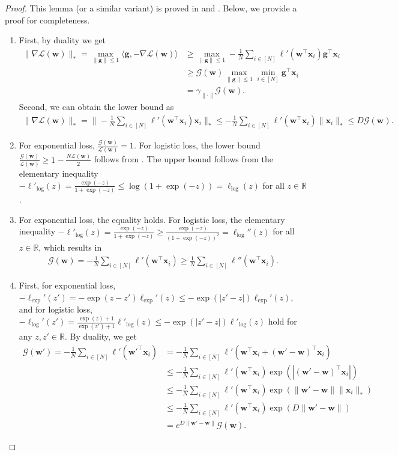 \documentclass{article} %
\theoremstyle{plain}
\theoremstyle{definition}
\theoremstyle{remark}
\def\gG{{\mathcal{G}}}
\newcommand{\Ls}{\mathcal{L}}
\def\bx{{\mathbf x}}
\def\bw{{\mathbf w}}
\def\bg{{\mathbf g}}
\begin{document}
\begin{proof}
This lemma (or a similar variant) is proved in \citet{zhang2024the} and \citet{fan2025implicitbiasspectraldescent}. Below, we provide a proof for completeness.
\begin{enumerate}[label=(\alph*)]
    \item First, by duality we get
    \begin{align*}
        \|\nabla \Ls(\bw)\|_* = \max_{\|\bg\|\leq 1} \langle \bg, -\nabla \Ls(\bw) \rangle &\geq \max_{\|\bg\|\leq 1} -\frac{1}{N} \sum_{i\in [N]} \ell'(\bw^\top \bx_i) \bg^\top \bx_i \\
        &\geq \gG(\bw) \max_{\|\bg\|\leq 1} \min_{i\in [N]} \bg^\top \bx_i \\
        &= \gamma_{\|\cdot\|} \gG(\bw).
    \end{align*}
    Second, we can obtain the lower bound as
    \begin{align*}
        \|\nabla \Ls(\bw)\|_* = \|-\frac{1}{N}\sum_{i\in [N]} \ell'(\bw^\top \bx_i) \bx_i\|_* \leq -\frac{1}{N} \sum_{i\in [N]} \ell'(\bw^\top \bx_i) \|\bx_i\|_* \leq D \gG(\bw).
    \end{align*}
    \item For exponential loss, $\frac{\gG(\bw)}{\Ls(\bw)}=1$. For logistic loss, the lower bound $\frac{\gG(\bw)}{\Ls(\bw)}\geq 1 - \frac{N\Ls(\bw)}{2}$ follows from \citet[Lemma C.7]{zhang2024the}. The upper bound follows from the elementary inequality $-\ell'_{\log}(z) = \frac{\exp(-z)}{1+\exp(-z)} \leq \log(1+\exp(-z)) = \ell_{\log} (z)$ for all $z\in \mathbb R$.
    \item For exponential loss, the equality holds. For logistic loss, the elementary inequality $-\ell'_{\log}(z) = \frac{\exp(-z)}{1+\exp(-z)} \geq \frac{\exp(-z)}{(1+\exp(-z))^2} = \ell_{\log}'' (z)$ for all $z\in \mathbb R$, which results in
    \begin{align*}
        \gG(\bw) = -\frac{1}{N} \sum_{i\in [N]}\ell'(\bw^\top \bx_i) \geq \frac{1}{N}\sum_{i\in [N]}\ell''(\bw^\top \bx_i).
    \end{align*}
    \item First, for exponential loss, $-\ell_{\exp}'(z') = -\exp(z-z')\ell_{\exp}'(z) \leq -\exp(|z'-z|)\ell_{\exp}'(z)$, and for logistic loss, $-\ell_{\log}'(z') = \frac{\exp(z)+1}{\exp(z')+1} \ell'_{\log}(z) \leq -\exp(|z'-z|) \ell'_{\log}(z)$ hold for any $z,z'\in \mathbb R$.
    By duality, we get
    \begin{align*}
        \gG(\bw') = -\frac{1}{N} \sum_{i\in [N]}\ell'(\bw'^\top \bx_i) &= -\frac{1}{N} \sum_{i\in [N]}\ell'(\bw^\top \bx_i + (\bw'-\bw)^\top \bx_i) \\
        &\leq -\frac{1}{N} \sum_{i\in [N]}\ell'(\bw^\top \bx_i) \exp(|(\bw'-\bw)^\top \bx_i|) \\
        &\leq -\frac{1}{N} \sum_{i\in [N]}\ell'(\bw^\top \bx_i) \exp(\|\bw'-\bw\|\|\bx_i\|_*) \\
        &\leq -\frac{1}{N} \sum_{i\in [N]}\ell'(\bw^\top \bx_i) \exp(D\|\bw'-\bw\|) \\
        &= e^{D\|\bw'-\bw\|} \gG(\bw).
    \end{align*}
\end{enumerate}
\end{proof}
\end{document}
